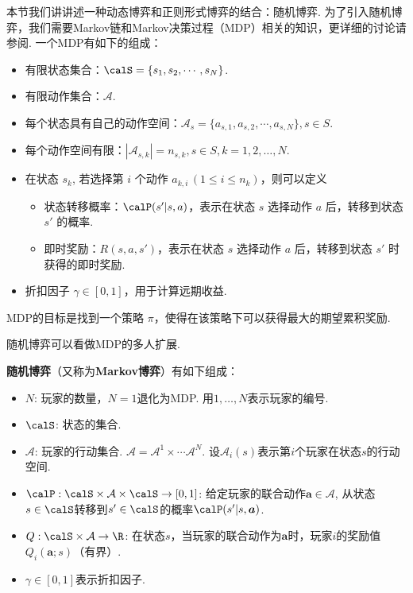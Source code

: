 本节我们讲讲述一种动态博弈和正则形式博弈的结合：随机博弈. 为了引入随机博弈，我们需要Markov链和Markov决策过程（MDP）相关的知识，更详细的讨论请参阅. 一个MDP有如下的组成：
\begin{itemize}
\item 有限状态集合：$\calS=\{s_1,s_2,\cdots,s_N\}$.
\item 有限动作集合：$\mathcal A$.
\item 每个状态具有自己的动作空间：$\mathcal A_s = \{a_{s,1},a_{s,2},\cdots, a_{s,N}\}, s\in S$.
\item 每个动作空间有限：$|\mathcal A_{s,k}|=n_{s,k}, s\in S, k=1,2,\dots,N$.
\item 在状态 $s_k$, 若选择第 $i$ 个动作 $a_{k,i}\,(1\leq i\leq n_{k})$，则可以定义
\begin{itemize}
        \item 状态转移概率：$\calP(s'|s,a)$，表示在状态 $s$ 选择动作 $a$ 后，转移到状态 $s'$ 的概率. 
        \item 即时奖励：$R(s,a,s')$，表示在状态 $s$ 选择动作 $a$ 后，转移到状态 $s'$ 时获得的即时奖励. 
   \end{itemize}
\item 折扣因子 $\gamma\in[0,1]$，用于计算远期收益.
\end{itemize}
MDP的目标是找到一个策略 $\pi$，使得在该策略下可以获得最大的期望累积奖励. 

随机博弈可以看做MDP的多人扩展. 

\begin{definition}
\textbf{随机博弈}（又称为\textbf{Markov博弈}）有如下组成：
\begin{itemize}
\item $N$: 玩家的数量，$N=1$退化为MDP. 用$1,\dots,N$表示玩家的编号.
\item $\calS$: 状态的集合.
\item $\mathcal A$: 玩家的行动集合. $\mathcal A=\mathcal A^1\times \cdots\mathcal A^N$. 设$\mathcal A_i(s)$表示第$i$个玩家在状态$s$的行动空间.
\item $\calP: \calS\times \mathcal A\times \calS\to [0,1]$: 给定玩家的联合动作$\boldsymbol a\in\mathcal A$, 从状态$s\in \calS$转移到$s'\in \calS$的概率$\calP(s'|s,\boldsymbol a)$.
\item $Q: \calS\times \mathcal A\to \R$: 在状态$s$，当玩家的联合动作为$\boldsymbol a$时，玩家$i$的奖励值$Q_i(\boldsymbol a;s)$（有界）.
\item $\gamma\in[0,1]$表示折扣因子.
\end{itemize}
\end{definition}

